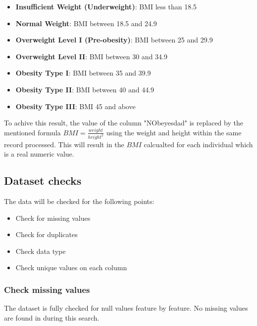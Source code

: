 \documentclass[11pt, a4paper]{article}
\begin{document}
\begin{itemize}
    \item \textbf{Insufficient Weight (Underweight)}: BMI less than 18.5
    \item \textbf{Normal Weight}: BMI between 18.5 and 24.9
    \item \textbf{Overweight Level I (Pre-obesity)}: BMI between 25 and 29.9
    \item \textbf{Overweight Level II}: BMI between 30 and 34.9
    \item \textbf{Obesity Type I}: BMI between 35 and 39.9
    \item \textbf{Obesity Type II}: BMI between 40 and 44.9
    \item \textbf{Obesity Type III}: BMI 45 and above
\end{itemize}

To achive this result, the value of the column "NObeyesdad" is replaced by the mentioned formula \(BMI = \frac{weight}{height^{2}}\) using 
the weight and height within the same record processed. This will result in the \(BMI\) calcualted for each individual which is a real numeric value.

\subsection{Dataset checks}

The data will be checked for the following points:

\begin{itemize}
    \item Check for missing values
    \item Check for duplicates
    \item Check data type
    \item Check unique values on each column
\end{itemize}

\subsubsection{Check missing values}

The dataset is fully checked for null values feature by feature. No missing values are found in during this search.
\end{document}
